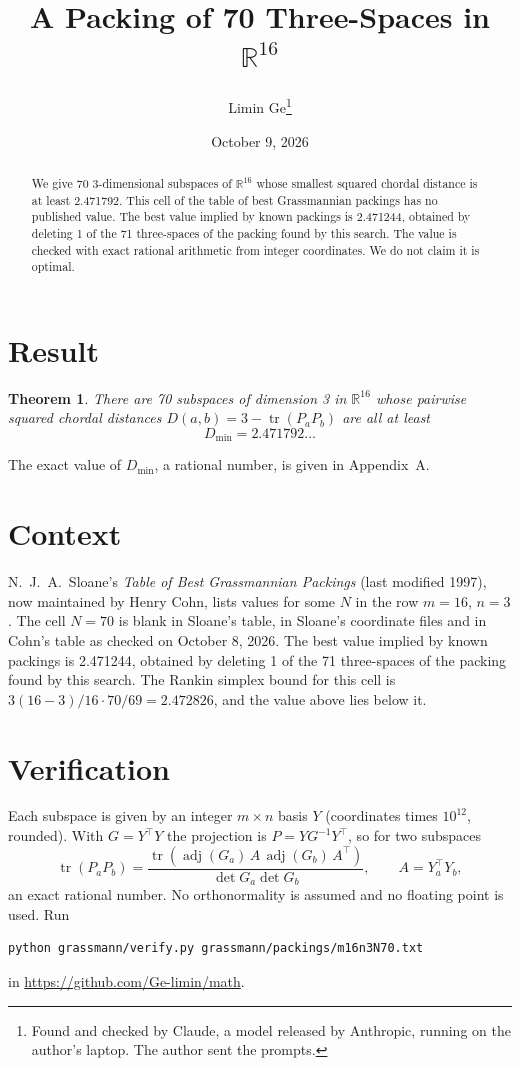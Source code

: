 \documentclass[11pt,a4paper]{article}
\title{A Packing of 70 Three-Spaces in $\mathbb{R}^{16}$}
\author{Limin Ge\thanks{Found and checked by Claude, a model released by Anthropic, running on the author's laptop. The author sent the prompts.}}
\date{October 9, 2026}
\newtheorem*{theorem}{Theorem}
\begin{document}
\maketitle
\begin{abstract}
We give 70 3-dimensional subspaces of $\mathbb{R}^{16}$ whose smallest squared chordal distance is at least 2.471792. This cell of the table of best Grassmannian packings has no published value. The best value implied by known packings is 2.471244, obtained by deleting 1 of the 71 three-spaces of the packing found by this search. The value is checked with exact rational arithmetic from integer coordinates. We do not claim it is optimal.
\end{abstract}

\section{Result}
\begin{theorem}
There are 70 subspaces of dimension 3 in $\mathbb{R}^{16}$ whose pairwise squared chordal distances $D(a,b) = 3 - \operatorname{tr}(P_aP_b)$ are all at least
\[ D_{\min} = 2.471792\ldots \]
\end{theorem}
The exact value of $D_{\min}$, a rational number, is given in Appendix~A.


\section{Context}
N.~J.~A.~Sloane's \emph{Table of Best Grassmannian Packings} (last modified 1997), now maintained by Henry Cohn, lists values for some $N$ in the row $m=16$, $n=3$. The cell $N=70$ is blank in Sloane's table, in Sloane's coordinate files and in Cohn's table as checked on October 8, 2026. The best value implied by known packings is 2.471244, obtained by deleting 1 of the 71 three-spaces of the packing found by this search. The Rankin simplex bound for this cell is $3(16-3)/16\cdot 70/69 = 2.472826$, and the value above lies below it.


\section{Verification}
Each subspace is given by an integer $m\times n$ basis $Y$ (coordinates times $10^{12}$, rounded). With $G=Y^\top Y$ the projection is $P=YG^{-1}Y^\top$, so for two subspaces
\[ \operatorname{tr}(P_aP_b)=\frac{\operatorname{tr}(\operatorname{adj}(G_a)\,A\,\operatorname{adj}(G_b)\,A^\top)}{\det G_a\det G_b},\qquad A=Y_a^\top Y_b, \]
an exact rational number. No orthonormality is assumed and no floating point is used. Run
\begin{verbatim}
python grassmann/verify.py grassmann/packings/m16n3N70.txt
\end{verbatim}
in \url{https://github.com/Ge-limin/math}.
\end{document}
